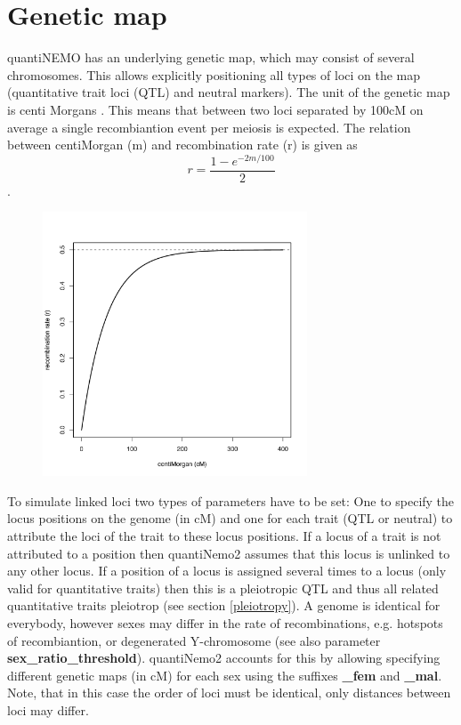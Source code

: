 \documentclass[letterpaper,12pt,oneside]{book}
\begin{document}
\chapter{Genetic map}\label{geneticMap}
quantiNEMO has an underlying genetic map, which may consist of several chromosomes. This allows
explicitly positioning all types of loci on the map (quantitative trait loci (QTL) and neutral
markers). The unit of the genetic map is centi Morgans \citep[cM]{Haldane_1919}. This means that
between two loci separated by 100cM on average a single recombiantion event per meiosis is expected.
The relation between centiMorgan (m) and recombination rate (r) is given as 
\[r=\frac{1-e^{-2m/100}}{2}\].

\begin{figure}[h]
	\centering
		\includegraphics[width=0.70\textwidth]{cM2r.pdf}
	\label{fig:centiMorgan to recombination rate}
\end{figure}



To simulate linked loci two types of parameters have to be set: One to
specify the locus positions on the genome (in cM) and one for each trait (QTL or neutral) to
attribute the loci of the trait to these locus positions. If a locus of a trait is not attributed
to a position then quantiNemo2 assumes that this locus is unlinked to any other locus. If a position of a locus is assigned several times to a locus (only valid for quantitative traits) then this is a pleiotropic QTL and thus all related quantitative traits pleiotrop (see section \ref{pleiotropy}). A genome is
identical for everybody, however sexes may differ in the rate of recombinations, e.g. hotspots of
recombiantion, or degenerated Y-chromosome (see also parameter
\textbf{sex\_ratio\_threshold}). quantiNemo2 accounts for this by allowing specifying
different genetic maps (in cM) for each sex using the suffixes \textbf{\_fem} and \textbf{\_mal}.
Note, that in this case the order of loci must be identical, only distances between loci
may differ.
\end{document}
